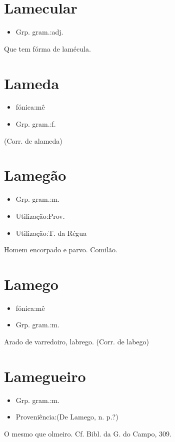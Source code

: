 \section{Lamecular}
\begin{itemize}
\item {Grp. gram.:adj.}
\end{itemize}
Que tem fórma de lamécula.
\section{Lameda}
\begin{itemize}
\item {fónica:mê}
\end{itemize}
\begin{itemize}
\item {Grp. gram.:f.}
\end{itemize}
(Corr. de \textunderscore alameda\textunderscore )
\section{Lamegão}
\begin{itemize}
\item {Grp. gram.:m.}
\end{itemize}
\begin{itemize}
\item {Utilização:Prov.}
\end{itemize}
\begin{itemize}
\item {Utilização:T. da Régua}
\end{itemize}
Homem encorpado e parvo.
Comilão.
\section{Lamego}
\begin{itemize}
\item {fónica:mê}
\end{itemize}
\begin{itemize}
\item {Grp. gram.:m.}
\end{itemize}
Arado de varredoiro, labrego.
(Corr. de \textunderscore labego\textunderscore )
\section{Lamegueiro}
\begin{itemize}
\item {Grp. gram.:m.}
\end{itemize}
\begin{itemize}
\item {Proveniência:(De \textunderscore Lamego\textunderscore , n. p.?)}
\end{itemize}
O mesmo que \textunderscore olmeiro\textunderscore . Cf. \textunderscore Bibl. da G. do Campo\textunderscore , 309.
